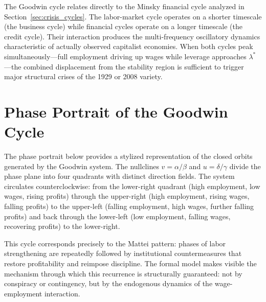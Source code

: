 \documentclass[12pt,a4paper]{article}
\theoremstyle{definition}
\theoremstyle{remark}
\begin{document}
The Goodwin cycle relates directly to the Minsky financial cycle analyzed in Section~\ref{sec:crisis_cycles}. The labor-market cycle operates on a shorter timescale (the business cycle) while financial cycles operate on a longer timescale (the credit cycle). Their interaction produces the multi-frequency oscillatory dynamics characteristic of actually observed capitalist economies. When both cycles peak simultaneously---full employment driving up wages while leverage approaches $\lambda^*$---the combined displacement from the stability region is sufficient to trigger major structural crises of the 1929 or 2008 variety.

\section{Phase Portrait of the Goodwin Cycle}
\label{app:goodwin_phase}

The phase portrait below provides a stylized representation of the closed orbits generated by the Goodwin system. The nullclines $v = \alpha/\beta$ and $u = \delta/\gamma$ divide the phase plane into four quadrants with distinct direction fields. The system circulates counterclockwise: from the lower-right quadrant (high employment, low wages, rising profits) through the upper-right (high employment, rising wages, falling profits) to the upper-left (falling employment, high wages, further falling profits) and back through the lower-left (low employment, falling wages, recovering profits) to the lower-right.

This cycle corresponds precisely to the Mattei pattern: phases of labor strengthening are repeatedly followed by institutional countermeasures that restore profitability and reimpose discipline. The formal model makes visible the mechanism through which this recurrence is structurally guaranteed: not by conspiracy or contingency, but by the endogenous dynamics of the wage-employment interaction.
\end{document}
